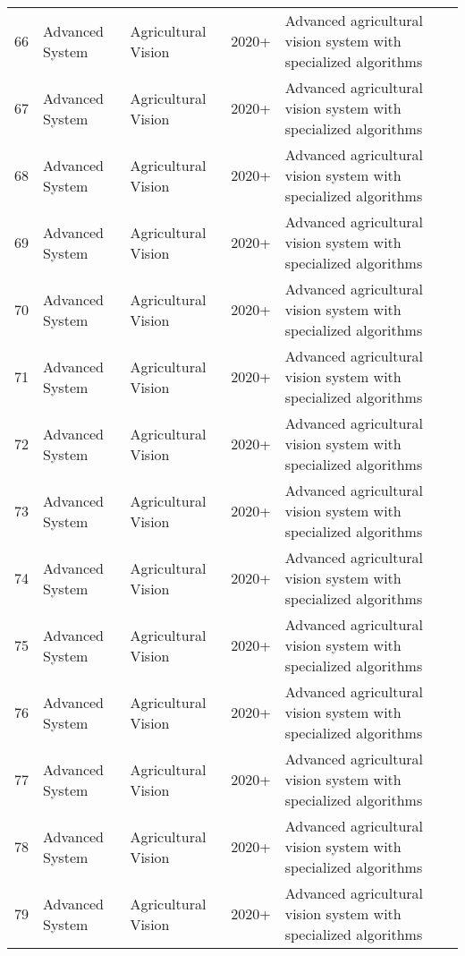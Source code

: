 \begin{table*}[htbp]
\begin{tabular}{p{}p{}p{}p{}p{}p{}}
 66 & Advanced System & Agricultural Vision & 2020+ & Advanced agricultural vision system with specialized algorithms & \cite{jiang2024tomato} \\
 67 & Advanced System & Agricultural Vision & 2020+ & Advanced agricultural vision system with specialized algorithms & \cite{agrieng2024stone} \\
 68 & Advanced System & Agricultural Vision & 2020+ & Advanced agricultural vision system with specialized algorithms & \cite{foodres2024fusion} \\
 69 & Advanced System & Agricultural Vision & 2020+ & Advanced agricultural vision system with specialized algorithms & \cite{li2024accurate} \\
 70 & Advanced System & Agricultural Vision & 2020+ & Advanced agricultural vision system with specialized algorithms & \cite{zhang2024dragon} \\
 71 & Advanced System & Agricultural Vision & 2020+ & Advanced agricultural vision system with specialized algorithms & \cite{zhang2024automatic} \\
 72 & Advanced System & Agricultural Vision & 2020+ & Advanced agricultural vision system with specialized algorithms & \cite{mingyou2024orchard} \\
 73 & Advanced System & Agricultural Vision & 2020+ & Advanced agricultural vision system with specialized algorithms & \cite{wang2023biologically} \\
 74 & Advanced System & Agricultural Vision & 2020+ & Advanced agricultural vision system with specialized algorithms & \cite{hou2023overview} \\
 75 & Advanced System & Agricultural Vision & 2020+ & Advanced agricultural vision system with specialized algorithms & \cite{rajendran2024towards} \\
 76 & Advanced System & Agricultural Vision & 2020+ & Advanced agricultural vision system with specialized algorithms & \cite{barth2018data} \\
 77 & Advanced System & Agricultural Vision & 2020+ & Advanced agricultural vision system with specialized algorithms & \cite{perez2018pattern} \\
 78 & Advanced System & Agricultural Vision & 2020+ & Advanced agricultural vision system with specialized algorithms & \cite{mu2020intact} \\
 79 & Advanced System & Agricultural Vision & 2020+ & Advanced agricultural vision system with specialized algorithms & \cite{liu2019mature} \\

\end{tabular}
\end{table*}
